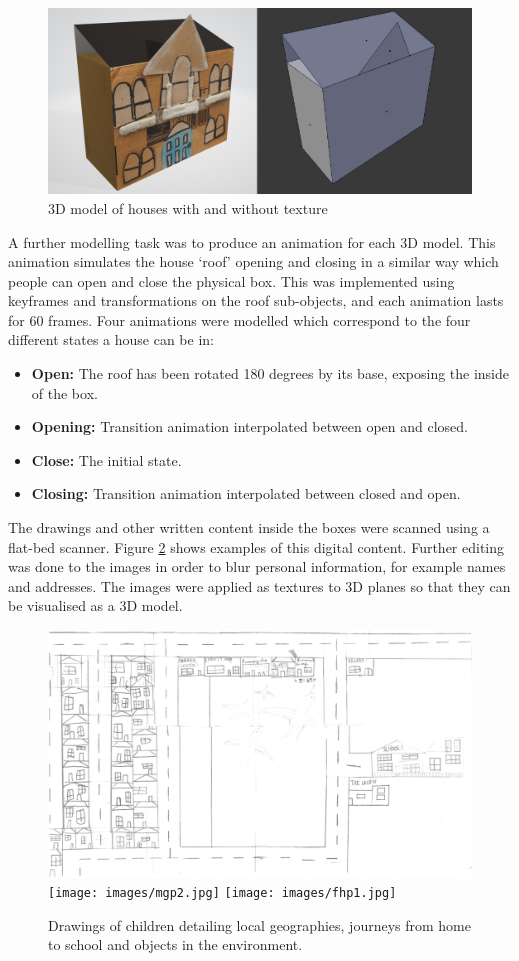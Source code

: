 \documentclass[acmlarge,screen,dvipsnames]{acmart}
\begin{document}
\begin{figure}[ht] \centering
\includegraphics[width=\linewidth]{images/models.PNG} \caption{3D model
of houses with and without texture} \label{fig:3Dhouse} 
\end{figure}

A further modelling task was to produce an animation for each 3D model. This
animation simulates the house `roof' opening and closing in a similar way
which people can open and close the physical box. This was implemented using
keyframes and transformations on the roof sub-objects, and each animation
lasts for 60 frames. Four animations were modelled which correspond to the
four different states a house can be in: 

\begin{itemize} 
  \item \textbf{Open:}
The roof has been rotated 180 degrees by its base, exposing the inside of the
box. 
\item \textbf{Opening:} Transition animation interpolated between open
and closed. 
\item \textbf{Close:} The initial state.  
\item \textbf{Closing:} Transition animation interpolated between closed and open. 

\end{itemize}


The drawings and other written content inside the boxes were scanned using a
flat-bed scanner. Figure \ref{fig:drawingmaps} shows examples of this digital
content. Further editing was done to the images in order to blur personal
information, for example names and addresses. The images were applied as
textures to 3D planes so that they can be visualised as a 3D model.

\begin{figure}[ht] \centering
\includegraphics[width=0.6\linewidth]{images/lkp1.jpg}
\texttt{[image: images/mgp2.jpg]}
\texttt{[image: images/fhp1.jpg]} 
\caption{Drawings
of children detailing local geographies, journeys from home to school and
objects in the environment.} \label{fig:drawingmaps} 
\end{figure}
\end{document}
